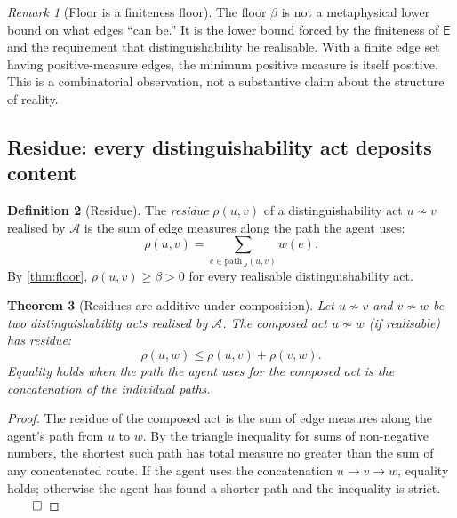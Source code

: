 \documentclass[11pt,twocolumn,a4paper]{article}
\theoremstyle{thmstyle}
\newtheorem{theorem}{Theorem}[section]
\theoremstyle{definition}
\newtheorem{definition}[theorem]{Definition}
\theoremstyle{remark}
\newtheorem{remark}[theorem]{Remark}
\newcommand{\Edg}{\mathsf{E}}
\newcommand{\Agent}{\mathcal{A}}
\newcommand{\Res}{\rho}
\newcommand{\floor}{\beta}
\begin{document}
\begin{remark}[Floor is a finiteness floor]
\label{rem:floor_is_finiteness}
The floor $\floor$ is not a metaphysical lower bound on what edges
``can be.'' It is the lower bound forced by the finiteness of
$\Edg$ and the requirement that distinguishability be realisable.
With a finite edge set having positive-measure edges, the minimum
positive measure is itself positive. This is a combinatorial
observation, not a substantive claim about the structure of
reality.
\end{remark}

\subsection{Residue: every distinguishability act deposits content}

\begin{definition}[Residue]
\label{def:residue}
The \emph{residue} $\Res(u,v)$ of a distinguishability act
$u \not\sim v$ realised by $\Agent$ is the sum of edge measures
along the path the agent uses:
\[
  \Res(u,v) = \sum_{e \in \mathrm{path}_\Agent(u,v)} w(e).
\]
By \cref{thm:floor}, $\Res(u,v) \geq \floor > 0$ for every
realisable distinguishability act.
\end{definition}

\begin{theorem}[Residues are additive under composition]
\label{thm:residue_additive}
Let $u \not\sim v$ and $v \not\sim w$ be two distinguishability
acts realised by $\Agent$. The composed act $u \not\sim w$ (if
realisable) has residue:
\[
  \Res(u, w) \leq \Res(u, v) + \Res(v, w).
\]
Equality holds when the path the agent uses for the composed act is
the concatenation of the individual paths.
\end{theorem}

\begin{proof}
The residue of the composed act is the sum of edge measures along
the agent's path from $u$ to $w$. By the triangle inequality for
sums of non-negative numbers, the shortest such path has total
measure no greater than the sum of any concatenated route. If the
agent uses the concatenation $u \to v \to w$, equality holds;
otherwise the agent has found a shorter path and the inequality is
strict. $\qed$
\end{proof}
\end{document}
